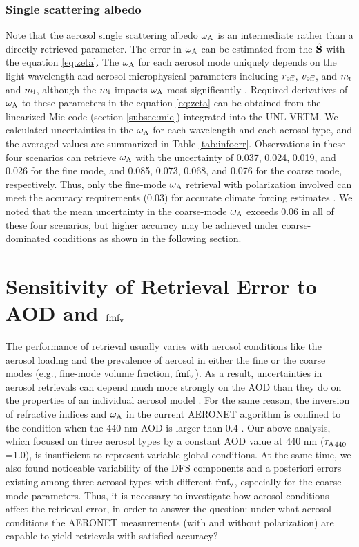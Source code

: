 \subsubsection{Single scattering albedo}

Note that the aerosol single scattering albedo $\omega_\text{A}$ is an intermediate rather
than a directly retrieved parameter. The error in $\omega_\text{A}$ can be estimated
from the $\hat{\mathbf{S}}$ with the equation \eqref{eq:zeta}. The $\omega_\text{A}$ for each
aerosol mode uniquely depends on the light wavelength and aerosol 
microphysical parameters including $r_\text{eff}$, $v_\text{eff}$, and $m_\text{r}$ and $m_\text{i}$,
although the $m_\text{i}$ impacts $\omega_\text{A}$ most significantly \citep{Hansen74}.
Required derivatives of $\omega_\text{A}$ to these parameters in the equation
\eqref{eq:zeta} can be obtained from the linearized Mie code (section
\ref{subsec:mie}) integrated into the UNL-VRTM. We calculated uncertainties 
in the $\omega_\text{A}$ for each wavelength and each aerosol type, and the averaged 
values are summarized in Table \ref{tab:infoerr}. Observations in these four 
scenarios can  retrieve $\omega_\text{A}$ with the uncertainty of 0.037, 0.024, 0.019, 
and 0.026 for  the fine mode, and 0.085, 0.073, 0.068, and 0.076 for the coarse
mode, respectively. Thus, only the fine-mode $\omega_\text{A}$ retrieval with polarization
involved can meet the accuracy requirements (0.03) for accurate climate forcing
estimates \citep{Mishchenko04}. We noted that the mean uncertainty in the
coarse-mode $\omega_\text{A}$ exceeds 0.06 in all of these four scenarios, but higher
accuracy may be achieved under coarse-dominated conditions as shown in the
following section.  

\section{Sensitivity of Retrieval Error to AOD and $\text{fmf}_\text{v}$} 
\label{sec:infosensi}

The performance of retrieval usually varies with aerosol conditions like
the aerosol loading and the prevalence of aerosol in either the fine or
the coarse modes (e.g., fine-mode volume fraction, $\text{fmf}_\text{v}$). As a result,
uncertainties in aerosol retrievals can depend much more strongly on the
AOD than they do on the properties of an individual aerosol model
\citep{Knobelspiesse12}. For the same reason, the inversion of
refractive indices and $\omega_\text{A}$ in the current AERONET algorithm is confined
to the condition when the 440-nm AOD is larger than 0.4
\citep{Dubovik00b, Holben06}. Our above analysis, which focused on three
aerosol types by a constant AOD value at 440 nm (${\tau_\text{A}}_{440}$=1.0), is
insufficient to represent variable global conditions. At the same time,
we also found noticeable variability of the DFS components and a
posteriori errors existing among three aerosol types with different
$\text{fmf}_\text{v}$, especially for the coarse-mode parameters. Thus, it is necessary
to investigate how aerosol conditions affect the retrieval error, in
order to answer the question: under what aerosol conditions the AERONET
measurements (with and without polarization) are capable to yield
retrievals with satisfied accuracy?

